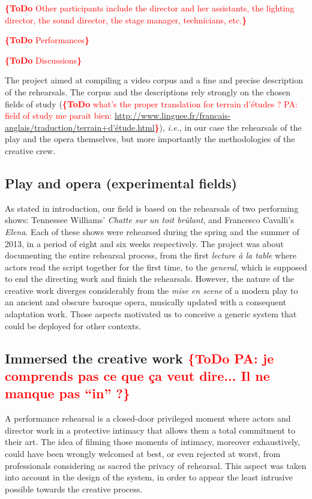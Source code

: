 \documentclass[conference]{IEEEtran}
\newcommand{\todo}[1]{\noindent\textcolor{red}{{\bf \{ToDo} #1{\bf \}}}}
\begin{document}
\todo{Other participants include the director and her assistants, the lighting director, the sound director, the stage manager, technicians, etc.}

\todo{Performances}

\todo{Discussions}

The project aimed at compiling a video corpus and a fine and precise description of the rehearsals. The corpus and the descriptions rely strongly on the chosen fields of study (\todo{what's the proper translation for terrain d'études ? PA: field of study me parait bien: \url{http://www.linguee.fr/francais-anglais/traduction/terrain+d'étude.html}}), \emph{i.e.}, in our case the rehearsals of the play and the opera themselves, but more importantly the methodologies of the creative crew.

\subsection{Play and opera (experimental fields)}

As stated in introduction, our field is based on the rehearsals of two performing shows: Tennessee Williams' \emph{Chatte sur un toit brûlant}, and Francesco Cavalli's \emph{Elena}.
Each of these shows were rehearsed during the spring and the summer of 2013, in a period of eight and six weeks respectively. The project was about documenting the entire rehearsal process, from the first \emph{lecture à la table} where actors read the script together for the first time, to the \emph{general}, which is supposed to end the directing work and finish the rehearsals.
However, the nature of the creative work diverges considerably from the \emph{mise en scene} of a modern play to an ancient and obscure baroque opera, musically updated with a consequent adaptation work.
Those aspects motivated us to conceive a generic system that could be deployed for other contexts.

\subsection{Immersed the creative work \todo{PA: je comprends pas ce que ça veut dire... Il ne manque pas ``in'' ?}}

A performance rehearsal is a closed-door privileged moment where actors and director work in a protective intimacy that allows them a total commitment to their art. The idea of filming those moments of intimacy, moreover exhaustively, could have been wrongly welcomed at best, or even rejected at worst, from professionals considering as sacred the privacy of rehearsal.
This aspect was taken into account in the design of the system, in order to appear the least intrusive possible towards the creative process.
\end{document}
